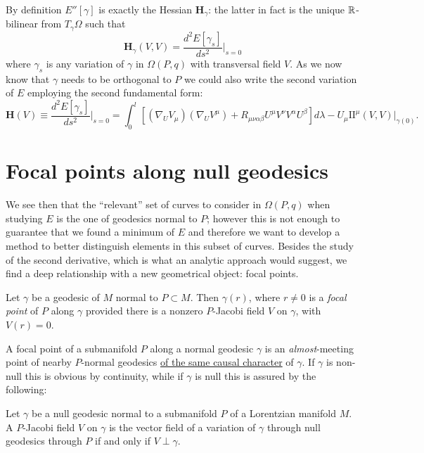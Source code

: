 By definition \(E''[\gamma]\) is exactly the Hessian \(\textbf{H}_{\gamma}\): the latter in fact is the unique \({\mathbb{R}}\)-bilinear from \(T_{\gamma}\Omega\) such that 
\[
\textbf{H}_{\gamma}(V, V) = \frac{d^2E[\gamma_s]}{ds^2}\Big\vert_{s = 0}
\]
where \(\gamma_s\) is any variation of \(\gamma\) in \(\Omega(P, q)\) with transversal field \(V\).
As we now know that \(\gamma\) needs to be orthogonal to \(P\) we could also write the second variation of \(E\) employing the second fundamental form:
\begin{equation}
	\label{eq:hessian}
	\textbf{H}(V) \equiv\frac{d^2E[\gamma_s]}{ds^2}\Big\vert_{s = 0} = 
	\int_{0}^{l} \left[(\nabla_UV_{\mu})(\nabla_UV^{\mu}) + R_{\mu\nu\alpha\beta}U^{\mu}V^{\nu}V^{\alpha}U^{\beta}\right] d\lambda - U_{\mu}\mathrm{I\!I}^{\mu}(V, V)\Big\vert_{\gamma(0)}.
\end{equation}

\section{Focal points along null geodesics}
\label{sec:fp-index-forms}
We see then that the ``relevant'' set of curves to consider in \(\Omega(P, q)\) when studying \(E\) is the one of geodesics normal to \(P\); however this is not enough to guarantee that we found a minimum of \(E\) and therefore we want to develop a method to better distinguish elements in this subset of curves. Besides the study of the second derivative, which is what an analytic approach would suggest, we find a deep relationship with a new geometrical object: focal points.

\vskip 4pt


\begin{definition}
	Let \(\gamma\) be a geodesic of \(M\) normal to \(P \subset M\). Then \(\gamma(r)\), where \(r \neq 0\) is a \emph{focal point} of \(P\) along \(\gamma\) provided there is a nonzero \(P\)-Jacobi field \(V\) on \(\gamma\), with \(V(r) = 0\).
\end{definition}

A focal point of a submanifold \(P\) along a normal geodesic \(\gamma\) is an \emph{almost}-meeting point of nearby \(P\)-normal geodesics \underline{of the same causal character} of \(\gamma\). If \(\gamma\) is non-null this is obvious by continuity, while if \(\gamma\) is null this is assured by the following:
\begin{corollary}
	\label{cor:same-causal-character}
	Let \(\gamma\) be a null geodesic normal to a submanifold \(P\) of a Lorentzian manifold \(M\). A \(P\)-Jacobi field \(V\) on \(\gamma\) is the vector field of a variation of \(\gamma\) through null geodesics through \(P\) if and only if \(V \perp \gamma\).
\end{corollary}

